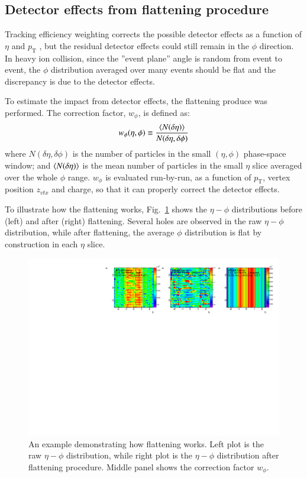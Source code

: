 \subsection{Detector effects from flattening procedure}
Tracking efficiency weighting corrects the possible detector effects as a function of $\eta$ and $p_\text{T}$ , but the residual detector effects could still remain in the $\phi$ direction. In heavy ion collision, since the ”event plane” angle is random from event to event, the $\phi$ distribution averaged over many events should be flat and the discrepancy is due to the detector effects.

To estimate the impact from detector effects, the flattening produce was performed. The correction factor, $w_\phi$, is defined as:
\begin{equation}
w_\phi(\eta,\phi)\equiv\frac{\lr{N(\delta\eta)}}{N(\delta\eta,\delta\phi)}
\end{equation}
where $N(\delta\eta,\delta\phi)$ is the number of particles in the small $(\eta,\phi)$ phase-space window; and $\lr{N(\delta\eta)}$ is the mean number of particles in the small $\eta$ slice averaged over the whole $\phi$ range. $w_\phi$ is evaluated run-by-run, as a function of $p_\text{T}$, vertex position $z_{vtx}$ and charge, so that it can properly correct the detector effects.

To illustrate how the flattening works, Fig.~\ref{fig:sys_flat_eg} shows the $\eta-\phi$ distributions before (left) and after (right) flattening. Several holes are observed in the raw $\eta-\phi$ distribution, while after flattening, the average $\phi$ distribution is flat by construction in each $\eta$ slice.
\begin{figure}[H]
\centering
\includegraphics[width=1.\linewidth]{figs/sec_ana/cumuFlat_Cent0_Zvtx5_Chg0_Pt1.pdf}
\caption{An example demonstrating how flattening works. Left plot is the raw $\eta-\phi$ distribution, while right plot is the $\eta-\phi$ distribution after flattening procedure. Middle panel shows the correction factor $w_\phi$.}
\label{fig:sys_flat_eg}
\end{figure}

